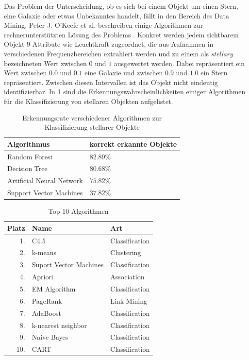 \documentclass[12pt,journal,compsoc,ngerman]{IEEEtran}
\begin{document}
Das Problem der Unterscheidung, ob es sich bei einem Objekt um einen Stern, eine Galaxie oder etwas Unbekanntes handelt, fällt in den Bereich des Data Mining. Peter J. O'Keefe et al. %
beschreiben einige Algorithmen zur rechnerunterstützten Lösung des Problems \cite{o2009star}. Konkret werden jedem sichtbarem Objekt 9 Attribute wie Leuchtkraft zugeordnet, die aus Aufnahmen in verschiedenen Frequenzbereichen extrahiert werden und zu einem als \emph{stellary} bezeichneten Wert zwischen $0$ und $1$ ausgewertet werden. Dabei repräsentiert ein Wert zwischen $0.0$ und $0.1$ eine Galaxie und zwischen $0.9$ und $1.0$ ein
Stern repräsentiert. Zwischen diesen Intervallen ist das Objekt nicht eindeutig identifizierbar. In \cref{tab:Erkennungswahrscheinlichkeiten} sind die Erkennungswahrscheinlichkeiten einiger 
Algorithmen für die Klassifizierung von stellaren Objekten aufgelistet.


\begin{table}[!t]
\centering
\label{tab:Erkennungswahrscheinlichkeiten}
\caption{Erkennungsrate verschiedener Algorithmen zur Klassifizierung stellarer Objekte \cite{o2009star}}
\begin{tabular}{l|l}
Algorithmus               & korrekt erkannte Objekte\\ \hline
Random Forest             & $82.89\%$ \\
Decision Tree             & $80.68\%$ \\
Artificial Neural Network & $75.82\%$ \\
Support Vector Machines   & $37.82\%$
\end{tabular}
\end{table}

\begin{table}[!b]
\centering
\label{tab:top10}
\caption{Top 10 Algorithmen \cite{wu2008top}}
\begin{tabular}{r|l|l}
Platz & Name & Art\\ \hline
1.& C4.5 & Classification\\
2.& k-means & Clustering\\
3.& Suport Vector Machines & Classification\\
4.& Apriori & Association\\
5.& EM Algorithm & Classification\\
6.& PageRank & Link Mining\\
7.& AdaBoost & Classification\\
8.& k-nearest neighbor & Classification\\
9.& Naive Bayes & Classification\\
10.& CART & Classification
\end{tabular}
\end{table}
\end{document}
